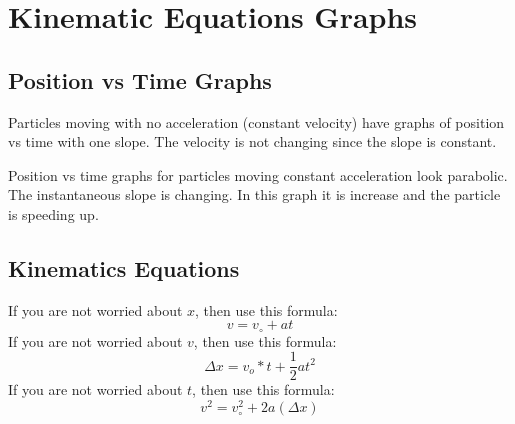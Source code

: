 \section{Kinematic Equations Graphs}
	
\subsection{Position vs Time Graphs}

Particles moving with no acceleration (constant velocity) have graphs of position vs time with one slope. The velocity is not changing since the slope is constant.
		
Position vs time graphs for particles moving constant acceleration look parabolic. The instantaneous slope is changing. In this graph it is increase and the particle is speeding up.
		
\subsection{Kinematics Equations}
If you are not worried about $x$, then use this formula: \[v=v_{\circ} +at\]
If you are not worried about $v$, then use this formula: \[\Delta x = v_o*t + \frac{1}{2}at^2\]
If you are not worried about $t$, then use this formula: \[v^2=v_\circ^2+2a(\Delta x)\]